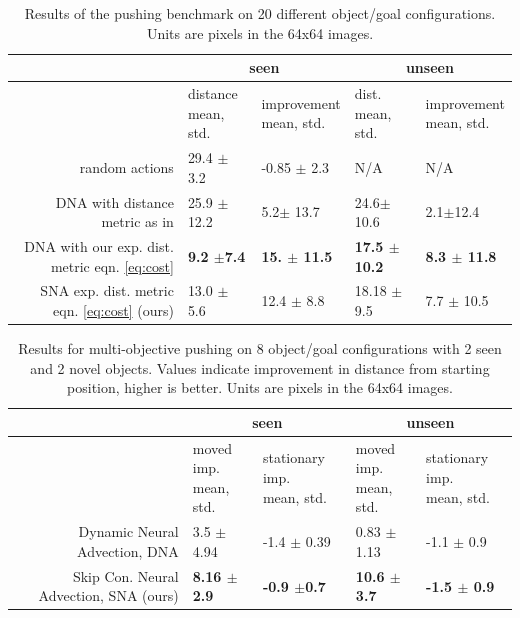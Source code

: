 \begin{table}
{\footnotesize
    \begin{center}
    \begin{tabular}{|r|l|l|l|l|}
     \hline
        & \multicolumn{2}{c|}{seen} & \multicolumn{2}{c|}{unseen} \\
      \hline
           & \thead{distance \\ mean, std.} &  \thead{improvement \\ mean, std.} &  \thead{dist. \\ mean, std.} & \thead{improvement \\ mean, std.}  \\
           \hline \hline
           
      random actions & 29.4  $\pm$ 3.2 &  -0.85 $\pm$  2.3 & N/A & N/A \\
       \hline \hline
       \hline
      DNA with distance metric as in \cite{foresight} & 25.9 $\pm$ 12.2 & 5.2$\pm$ 13.7 & 24.6$\pm$10.6 & 2.1$\pm$12.4 \\
       \hline
      DNA with our exp. dist. metric eqn. \ref{eq:cost} & \textbf{9.2 $\pm$7.4} &  \textbf{15. $\pm$  11.5} & \textbf{17.5 $\pm$ 10.2} &  \textbf{8.3 $\pm$ 11.8}\\ 
      \hline
      SNA exp. dist. metric eqn. \ref{eq:cost} (ours)& 13.0 $\pm$  5.6 &  12.4 $\pm$ 8.8 & 18.18 $\pm$ 9.5 & 7.7 $\pm$ 10.5\\
      \hline
    \end{tabular}
    \end{center}
    }
    \caption{Results of the pushing benchmark on 20 different object/goal configurations. Units are pixels in the 64x64 images.}
    \label{table:res_longd}
\end{table}


\begin{table}
\centering
{\footnotesize
\begin{tabular}{|r|l|l|l|l|}
 \hline
    & \multicolumn{2}{c|}{seen} & \multicolumn{2}{c|}{unseen} \\
  \hline
        &  \thead{moved imp. \\ mean, std.} &   \thead{stationary imp. \\ mean, std.}  &  \thead{moved imp. \\ mean, std.} &   \thead{stationary imp. \\ mean, std.}  \\
   \hline \hline
  Dynamic Neural Advection, DNA \cite{foresight} & 3.5 $\pm$4.94 &  -1.4 $\pm$ 0.39 & 0.83 $\pm$1.13 &  -1.1 $\pm$ 0.9\\ 
  \hline
  Skip Con. Neural Advection, SNA (ours) & \textbf{8.16 $\pm$ 2.9} &  \textbf{-0.9 $\pm$0.7} & \textbf{10.6 $\pm$ 3.7} & \textbf{-1.5 $\pm$ 0.9} \\
  \hline
\end{tabular}
}

\caption{Results for multi-objective pushing on 8 object/goal configurations with 2 seen and 2 novel objects. Values indicate improvement in distance from starting position, higher is better. Units are pixels in the 64x64 images.} 
\label{table:mult_obj}
    \vspace{-0.2in}
\end{table}

